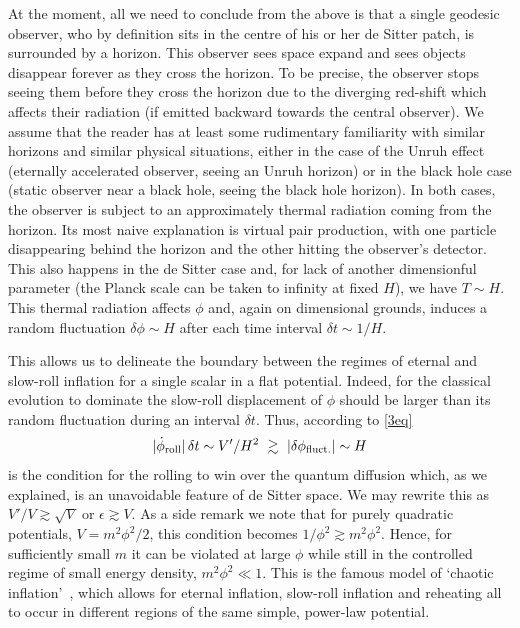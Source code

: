 \documentclass[12pt]{article}
\newcommand{\be}{\begin{equation}}
\newcommand{\ee}{\end{equation}}
\numberwithin{equation}{section}
\begin{document}
At the moment, all we need to conclude from the above is that a single geodesic observer, who by definition sits in the centre of his or her de Sitter patch, is surrounded by a horizon. This observer sees space expand and sees objects disappear forever as they cross the horizon. To be precise, the observer stops seeing them before they cross the horizon due to the diverging red-shift which affects their radiation (if emitted backward towards the central observer). We assume that the reader has at least some rudimentary familiarity with similar horizons and similar physical situations, either in the case of the Unruh effect (eternally accelerated observer, seeing an Unruh horizon) or in the black hole case (static observer near a black hole, seeing the black hole horizon). In both cases, the observer is subject to an approximately thermal radiation coming from the horizon. Its most naive explanation is virtual pair production, with one particle disappearing behind the horizon and the other hitting the observer's detector. This also happens in the de Sitter case and, for lack of another dimensionful parameter (the Planck scale can be taken to infinity at fixed $H$), we have $T\sim H$. This thermal radiation affects $\phi$ and, again on dimensional grounds, induces a random fluctuation $\delta\phi\sim H$ after each time interval $\delta t \sim 1/H$.

This allows us to delineate the boundary between the regimes of eternal and slow-roll inflation for a single scalar in a flat potential. Indeed, for the classical evolution to dominate the slow-roll displacement of $\phi$ should be larger than its random fluctuation during an interval $\delta t$. Thus, according to \eqref{3eq}
\be
|\dot{\phi}_{\rm roll}|\,\delta t\sim V'/H^2 \,\,\gtrsim\,\, |\delta\phi_{\rm fluct.}|
\sim H
\ee
is the condition for the rolling to win over the quantum diffusion which, as we explained, is an unavoidable feature of de Sitter space. We may rewrite this as
$V'/V\gtrsim \sqrt{V}$ or $\epsilon \gtrsim V$. As a side remark we note that for purely quadratic potentials, $V= m^2\phi^2/2$, this condition becomes $1/\phi^2\gtrsim m^2\phi^2$. Hence, for sufficiently small $m$ it can be violated at large $\phi$ while still in the controlled regime of small energy density, $m^2\phi^2\ll 1$. This is the famous model of `chaotic inflation'~\cite{Linde:1983gd}, which allows for eternal inflation, slow-roll inflation and reheating all to occur in different regions of the same simple, power-law potential.
\end{document}

